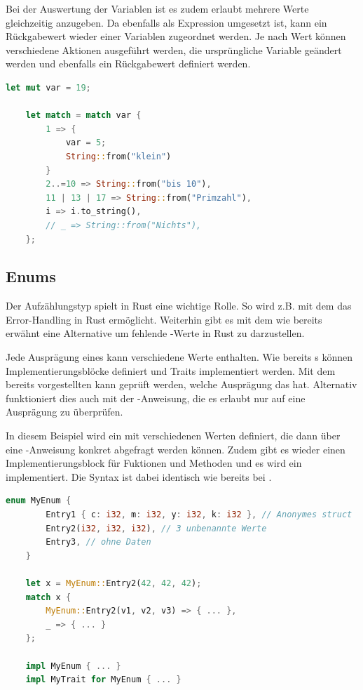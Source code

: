 \documentclass[11pt,a4paper, ngerman]{article}
\begin{document}
Bei der Auswertung der Variablen ist es zudem erlaubt mehrere Werte gleichzeitig anzugeben. Da  ebenfalls als Expression umgesetzt ist, kann ein Rückgabewert wieder einer Variablen zugeordnet werden. Je nach Wert können verschiedene Aktionen ausgeführt werden, die ursprüngliche Variable geändert werden und ebenfalls ein Rückgabewert definiert werden.

\begin{lstlisting}[language=rust, caption={match}]
    let mut var = 19;

    let match = match var {
        1 => {
            var = 5;
            String::from("klein")
        }
        2..=10 => String::from("bis 10"),
        11 | 13 | 17 => String::from("Primzahl"),
        i => i.to_string(),
        // _ => String::from("Nichts"),
    };
\end{lstlisting}

\subsection{Enums}
Der Aufzählungstyp  spielt in Rust eine wichtige Rolle. So wird z.B. mit dem   das Error-Handling in Rust ermöglicht. Weiterhin gibt es mit dem   wie bereits erwähnt eine Alternative um fehlende -Werte in Rust zu darzustellen.

Jede Ausprägung eines  kann verschiedene Werte enthalten. Wie bereits s können Implementierungsblöcke definiert und Traits implementiert werden. Mit dem bereits vorgestellten  kann geprüft werden, welche Ausprägung das  hat. Alternativ funktioniert dies auch mit der -Anweisung, die es erlaubt nur auf eine Ausprägung zu überprüfen.

In diesem Beispiel wird ein  mit verschiedenen Werten definiert, die dann über eine -Anweisung konkret abgefragt werden können. Zudem gibt es wieder einen Implementierungsblock für Fuktionen und Methoden und es wird ein  implementiert. Die Syntax ist dabei identisch wie bereits bei .

\begin{lstlisting}[language=rust, caption={enum}]
    enum MyEnum {
        Entry1 { c: i32, m: i32, y: i32, k: i32 }, // Anonymes struct
        Entry2(i32, i32, i32), // 3 unbenannte Werte
        Entry3, // ohne Daten
    }

    let x = MyEnum::Entry2(42, 42, 42);
    match x {
        MyEnum::Entry2(v1, v2, v3) => { ... },
        _ => { ... }
    };

    impl MyEnum { ... }
    impl MyTrait for MyEnum { ... }
\end{lstlisting}
\end{document}

